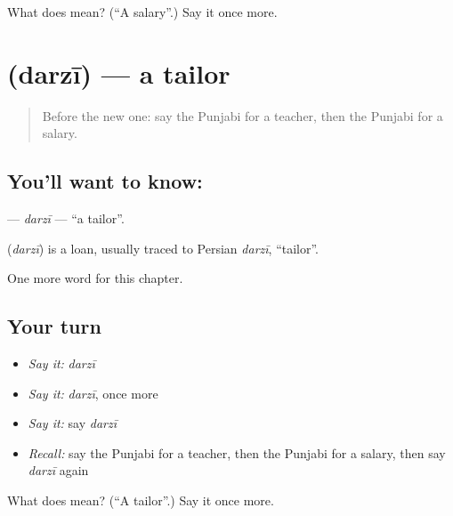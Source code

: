 \begin{tcolorbox}[breakable,colback=teal!4,colframe=teal!35!black,title={Before you move on}]
What does  mean? (\textquotedblleft{}A salary\textquotedblright{}.) Say it once more.
\end{tcolorbox}
\section[\texorpdfstring{\pa{ਦਰਜ਼ੀ} (darzī)}{ਦਰਜ਼ੀ (darzī)}]{ (darzī) — a tailor}

\label{lesson:PA-C139-darzi}



\begin{quote}
Before the new one: say the Punjabi for a teacher, then the Punjabi for a salary.
\end{quote}

\subsection*{You'll want to know: }
\textbf{} — \emph{darzī} — \textquotedblleft{}a tailor\textquotedblright{}.

\begin{cousinweb}
\textbf{} (\emph{darzī}) is a loan, usually traced to Persian \emph{darzī}, \textquotedblleft{}tailor\textquotedblright{}.
\end{cousinweb}

\begin{grammarlens}[title={What you've built}]
One more word for this chapter.
\end{grammarlens}

\subsection*{Your turn}
\begin{itemize}
\raggedright
  \item \emph{Say it:} \emph{darzī}
  \item \emph{Say it:} \emph{darzī}, once more
  \item \emph{Say it:} say \emph{darzī}
  \item \emph{Recall:} say the Punjabi for a teacher, then the Punjabi for a salary, then say \emph{darzī} again
\end{itemize}

\begin{tcolorbox}[breakable,colback=teal!4,colframe=teal!35!black,title={Before you move on}]
What does  mean? (\textquotedblleft{}A tailor\textquotedblright{}.) Say it once more.
\end{tcolorbox}
